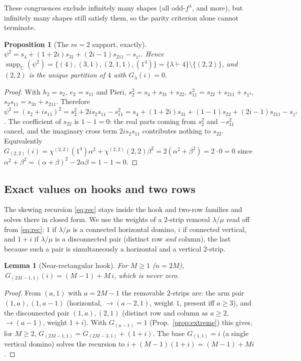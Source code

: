 \documentclass[11pt]{article}
\newtheorem{lemma}{Lemma}
\newtheorem{proposition}{Proposition}
\theoremstyle{definition}
\theoremstyle{remark}
\DeclareMathOperator{\supp}{supp}
\newcommand{\CC}{\mathbb{C}}
\newcommand{\la}{\lambda}
\begin{document}
These congruences exclude infinitely many shapes (all odd-$f^\la$, and more), but
infinitely many shapes still satisfy them, so the parity criterion alone cannot
terminate.

\begin{proposition}[The $m=2$ support, exactly]\label{prop:m2}
$\psi^2=s_{4}+(1+2i)s_{31}+(2i-1)s_{211}-s_{1^4}$. Hence
$\supp_\CC(\psi^2)=\{(4),(3,1),(2,1,1),(1^4)\}=\{\la\vdash4\}\setminus\{(2,2)\}$,
and $(2,2)$ is the unique partition of $4$ with $G_\la(i)=0$.
\end{proposition}
\begin{proof}
With $h_2=s_2,\ e_2=s_{11}$ and Pieri, $s_2^2=s_4+s_{31}+s_{22}$,
$s_{11}^2=s_{22}+s_{211}+s_{1^4}$, $s_2 s_{11}=s_{31}+s_{211}$. Therefore
$\psi^2=(s_2+is_{11})^2=s_2^2+2is_2 s_{11}-s_{11}^2
=s_4+(1+2i)s_{31}+(1-1)s_{22}+(2i-1)s_{211}-s_{1^4}$.
The coefficient of $s_{22}$ is $1-1=0$: the real parts coming from $s_2^2$ and
$-s_{11}^2$ cancel, and the imaginary cross term $2is_2 s_{11}$ contributes
nothing to $s_{22}$. Equivalently $G_{(2,2)}(i)=\chi^{(2,2)}(1^4)\alpha^2+
\chi^{(2,2)}(2,2)\beta^2=2(\alpha^2+\beta^2)=2\cdot0=0$ since
$\alpha^2+\beta^2=(\alpha+\beta)^2-2\alpha\beta=1-1=0$.
\end{proof}

\subsection{Exact values on hooks and two rows}

The skewing recursion \eqref{eq:rec} stays inside the hook and two-row families and
solves there in closed form. We use the weights of a $2$-strip removal $\la/\mu$
read off from \eqref{eq:rec}: $1$ if $\la/\mu$ is a connected horizontal domino, $i$
if connected vertical, and $1+i$ if $\la/\mu$ is a disconnected pair (distinct row
\emph{and} column), the last because such a pair is simultaneously a horizontal and a
vertical $2$-strip.

\begin{lemma}[Near-rectangular hook]\label{lem:21}
For $M\ge1$ \emph{(}$n=2M$\emph{)}, $\,G_{(2M-1,1)}(i)=(M-1)+M\,i$, which is never
zero.
\end{lemma}
\begin{proof}
From $(a,1)$ with $a=2M-1$ the removable $2$-strips are: the arm pair
$(1,a),(1,a-1)$ (horizontal, $\to(a-2,1)$, weight $1$, present iff $a\ge3$), and the
disconnected pair $(1,a),(2,1)$ (distinct row and column as $a\ge2$, $\to(a-1)$,
weight $1+i$). With $G_{(a-1)}=1$ (Prop.~\ref{prop:extreme}) this gives, for $M\ge2$,
$G_{(2M-1,1)}=G_{(2M-3,1)}+(1+i)$. The base $G_{(1,1)}=i$ (a single vertical domino)
solves the recursion to $i+(M-1)(1+i)=(M-1)+Mi$.
\end{proof}
\end{document}
